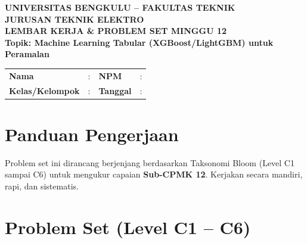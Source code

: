 \documentclass[11pt,a4paper]{article}
\begin{document}
\begin{center}
    {\large \textbf{\color{primaryblue}UNIVERSITAS BENGKULU -- FAKULTAS TEKNIK}}\\[0.1cm]
    {\large \textbf{\color{secondaryblue}JURUSAN TEKNIK ELEKTRO}}\\[0.25cm]
    {\LARGE \textbf{\color{primaryblue}LEMBAR KERJA \& PROBLEM SET MINGGU 12}}\\[0.1cm]
    {\normalsize \textbf{Topik: Machine Learning Tabular (XGBoost/LightGBM) untuk Peramalan}}
\end{center}

\vspace{0.2cm}

\begin{tcolorbox}[colback=boxbg,colframe=primaryblue,arc=2mm,title=\textbf{Identitas Mahasiswa}]
\small
\begin{tabular}{p{2.5cm}p{5.5cm}p{2.5cm}p{4.5cm}}
\textbf{Nama} & : \dotfill & \textbf{NPM} & : \dotfill \\
\textbf{Kelas/Kelompok} & : \dotfill & \textbf{Tanggal} & : \dotfill \\
\end{tabular}
\end{tcolorbox}

\vspace{0.2cm}

\section{Panduan Pengerjaan}
Problem set ini dirancang berjenjang berdasarkan Taksonomi Bloom (Level C1 sampai C6) untuk mengukur capaian \textbf{Sub-CPMK 12}. Kerjakan secara mandiri, rapi, dan sistematis.

\section{Problem Set (Level C1 -- C6)}
\end{document}
